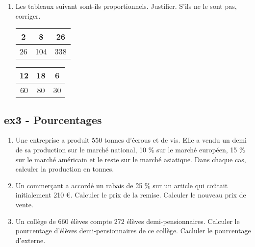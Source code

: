 \documentclass[12pt]{article}
\begin{document}
\begin{enumerate}
\item Les tableaux suivant sont-ils proportionnels. Justifier. S'ils ne le sont pas, corriger.

  \begin{multicols}{2}\noindent
    \vspace{0.4cm}
    \begin{center}
      \begin{tabular}{|c|c|c|}
        \hline
        2 & 8 & 26 \\  \hline
        26 & 104 & 338\\  \hline
      \end{tabular}
    \end{center}
    \vspace{1cm}
    \Pointilles[5]
  \end{multicols}

  \begin{multicols}{2}\noindent
    \vspace{0.4cm}
    \begin{center}
      \begin{tabular}{|c|c|c|}
        \hline
        12 & 18 & 6 \\  \hline
        60 & 80 & 30\\  \hline
      \end{tabular}
    \end{center}
    \vspace{1cm}
    \Pointilles[5]
  \end{multicols}

\end{enumerate}
\newpage
\subsection*{ex3 - Pourcentages}

\begin{enumerate}
\item Une entreprise a produit 550 tonnes d'écrous et de vis. Elle a vendu un demi de sa production sur le marché national, 10 \% sur le marché européen, 15 \% sur le marché américain et le reste sur le marché asiatique. Dans chaque cas, calculer la production en tonnes.
\item Un commerçant a accordé un rabais de 25 \% sur un article qui coûtait initialement 210 \euro. Calculer le prix de la remise. Calculer le nouveau prix de vente.
\item Un collège de 660 élèves compte 272 élèves demi-pensionnaires. Calculer le pourcentage d'élèves demi-pensionnaires de ce collège. Cacluler le pourcentage d'externe. 
\end{enumerate}
\Pointilles[17]
\end{document}

